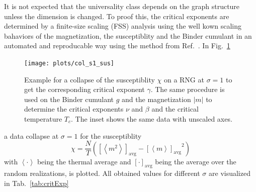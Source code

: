 \documentclass[pre,twocolumn,groupedaddress,showpacs,showkeys,amsmath,amssymb,floatfix]{revtex4-1}
\newcommand{\avg}[1]{\ensuremath{\left< #1 \right>}}
\newcommand{\avgR}[1]{\ensuremath{\left[ #1 \right] _{\mathrm{avg}}}}
\newcommand{\brac}[1]{\ensuremath{\left(#1\right)}}
\begin{document}
        It is not expected that the universality class depends on the graph
        structure unless the dimension is changed.
        To proof this, the critical exponents are determined by a finite-size
        scaling (FSS) analysis using the well kown scaling bahaviors of the
        magnetization, the susceptiblity and the Binder cumulant
        in an automated and reproducable way using the
        method from Ref.~\cite{autoscale2009}.
        In Fig.~\ref{fig:collapse}
        \begin{figure}[htb]
            \texttt{[image: plots/col\_s1\_sus]}
            \caption[Examples of Determining Critical Temperature and Exponents]
            {
                Example for a collapse of the susceptiblity \(\chi\) on a RNG at
                \(\sigma = 1\) to get the corresponding critical exponent $\gamma$.
                The same procedure is used on the Binder cumulant $g$ and the
                magnetization $|m|$ to determine the critical exponents
                \(\nu\) and \(\beta\) and the critical temperature \(T_c\).
                The inset shows the same data with unscaled axes.
            }
            \label{fig:collapse}
        \end{figure}
        a data collapse at $\sigma = 1$ for the susceptiblity
        \[\chi = \frac{N}{T}\brac{\avgR{\avg{m^2}}-\avgR{\avg{m}}^2}\]
        with $\avg{\cdot}$ being the thermal average and $\avgR{\cdot}$ being the
        average over the random realizations, is plotted.
        All obtained values for different $\sigma$ are visualized in Tab.~\ref{tab:critExp}
\end{document}
